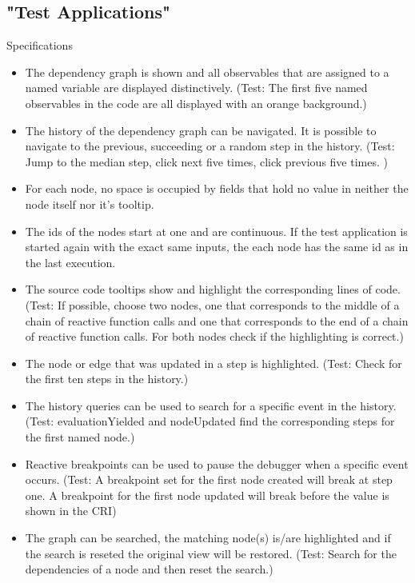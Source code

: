 	\subsection{"Test Applications"}
	Specifications
	\begin{itemize}
		\item The dependency graph is shown and all observables that are assigned to a named variable are displayed distinctively.
		(Test: The first five named observables in the code are all displayed with an orange background.)
		\item The history of the dependency graph can be navigated. It is possible to navigate to the previous, succeeding or a random step in the history. (Test: Jump to the median step, click next five times, click previous five times. )
		\item For each node, no space is occupied by fields that hold no value in neither the node itself nor it's tooltip.
		\item The ids of the nodes start at one and are continuous. If the test application is started again with the exact same inputs, the each node has the same id as in the last execution.
		\item The source code tooltips show and highlight the corresponding lines of code. (Test: If possible, choose two nodes, one that corresponds to the middle of a chain of reactive function calls and one that corresponds to the end of a chain of reactive function calls. For both nodes check if the highlighting is correct.)
		\item The node or edge that was updated in a step is highlighted. (Test: Check for the first ten steps in the history.)
		\item The history queries can be used to search for a specific event in the history. (Test: evaluationYielded and nodeUpdated find the corresponding steps for the first named node.)
		\item Reactive breakpoints can be used to pause the debugger when a specific event occurs. (Test: A breakpoint set for the first node created will break at step one. A breakpoint for the first node updated will break before the value is shown in the CRI)
		\item The graph can be searched, the matching node(s) is/are highlighted and if the search is reseted the original view will be restored. (Test: Search for the dependencies of a node and then reset the search.)
	\end{itemize}
	
